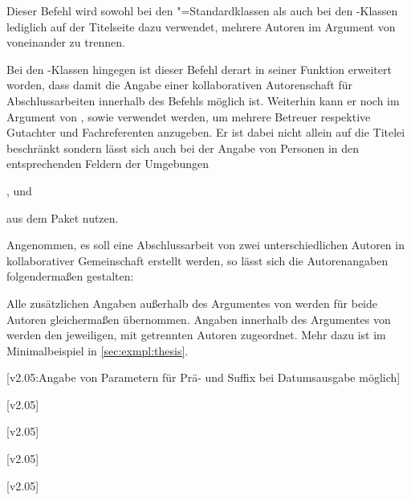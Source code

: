 \begin{DeclareEntity*}{}
\begin{DeclareEntity*}{}
\begin{DeclareEntity*}{}
\begin{Declaration}
Dieser Befehl wird sowohl bei den "=Standardklassen als auch 
bei den \KOMAScript-Klassen lediglich auf der Titelseite dazu verwendet, 
mehrere Autoren im Argument von  voneinander zu trennen.

Bei den \TUDScript-Klassen hingegen ist dieser Befehl derart in seiner Funktion 
erweitert worden, dass damit die Angabe einer kollaborativen Autorenschaft für 
Abschlussarbeiten innerhalb des Befehls  möglich ist. Weiterhin 
kann er noch im Argument von ,  sowie 
 verwendet werden, um mehrere Betreuer respektive Gutachter 
und Fachreferenten anzugeben. Er ist dabei nicht allein auf die Titelei 
beschränkt sondern lässt sich auch bei der Angabe von Personen in den 
entsprechenden Feldern der Umgebungen
\begin{Entity}{}
,  und 
\end{Entity}
aus dem Paket  nutzen.
\end{Declaration}
%
\begin{Example}
Angenommen, es soll eine Abschlussarbeit von zwei unterschiedlichen Autoren in 
kollaborativer Gemeinschaft erstellt werden, so lässt sich die Autorenangaben 
folgendermaßen gestalten:
\begin{Code}
\author{%
  Mickey Mouse%
\and%
  Donald Duck%
}
\end{Code}
Alle zusätzlichen Angaben außerhalb des Argumentes von  werden 
für beide Autoren gleichermaßen übernommen. Angaben innerhalb des Argumentes 
von  werden den jeweiligen, mit  getrennten Autoren 
zugeordnet. Mehr dazu ist im Minimalbeispiel in \autoref{sec:exmpl:thesis}.
\end{Example}

\begin{Declaration}
  {}
  [v2.05:Angabe von Parametern für Prä- und Suffix bei Datumsausgabe möglich]
\begin{Declaration}
  {}
  [v2.05]
\begin{Declaration}
  {}
  [v2.05]
\begin{Declaration}
  {}
  [v2.05]
\begin{Declaration}
  {}
  [v2.05]
\begin{Declaration}
  {}


\end{Declaration}
\end{Declaration}
\end{Declaration}
\end{Declaration}
\end{Declaration}
\end{Declaration}
\end{DeclareEntity*}
\end{DeclareEntity*}
\end{DeclareEntity*}
